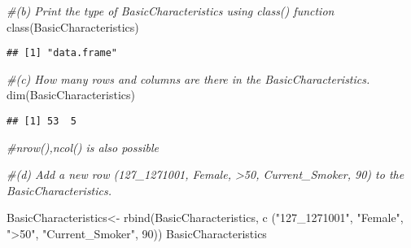 \documentclass[
]{article}
\newenvironment{Shaded}{\begin{snugshade}}{\end{snugshade}}
\newcommand{\CommentTok}[1]{\textcolor[rgb]{0.56,0.35,0.01}{\textit{#1}}}
\newcommand{\DecValTok}[1]{\textcolor[rgb]{0.00,0.00,0.81}{#1}}
\newcommand{\FunctionTok}[1]{\textcolor[rgb]{0.00,0.00,0.00}{#1}}
\newcommand{\NormalTok}[1]{#1}
\newcommand{\OtherTok}[1]{\textcolor[rgb]{0.56,0.35,0.01}{#1}}
\newcommand{\StringTok}[1]{\textcolor[rgb]{0.31,0.60,0.02}{#1}}
\begin{document}
\begin{Shaded}
\begin{Highlighting}[]
\CommentTok{\#(b) Print the type of BasicCharacteristics using class() function}
\FunctionTok{class}\NormalTok{(BasicCharacteristics)}
\end{Highlighting}
\end{Shaded}

\begin{verbatim}
## [1] "data.frame"
\end{verbatim}

\begin{Shaded}
\begin{Highlighting}[]
\CommentTok{\#(c) How many rows and columns are there in the BasicCharacteristics.}
\FunctionTok{dim}\NormalTok{(BasicCharacteristics)}
\end{Highlighting}
\end{Shaded}

\begin{verbatim}
## [1] 53  5
\end{verbatim}

\begin{Shaded}
\begin{Highlighting}[]
\CommentTok{\#nrow(),ncol() is also possible}


\CommentTok{\#(d) Add a new row (127\_1271001, Female, \textgreater{}50, Current\_Smoker, 90) to the BasicCharacteristics.}

\NormalTok{BasicCharacteristics}\OtherTok{\textless{}{-}} \FunctionTok{rbind}\NormalTok{(BasicCharacteristics, }\FunctionTok{c}\NormalTok{ (}\StringTok{"127\_1271001"}\NormalTok{, }\StringTok{"Female"}\NormalTok{, }\StringTok{"\textgreater{}50"}\NormalTok{, }\StringTok{"Current\_Smoker"}\NormalTok{, }\DecValTok{90}\NormalTok{))}
\NormalTok{BasicCharacteristics}
\end{Highlighting}
\end{Shaded}
\end{document}
